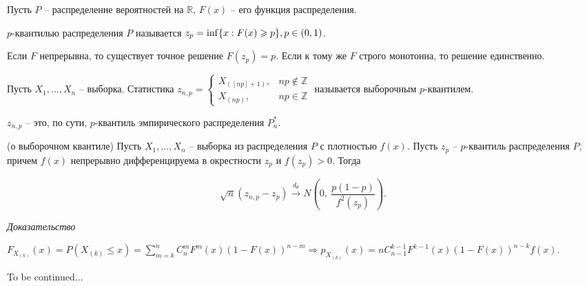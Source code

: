Пусть $\displaystyle P$ -- распределение вероятностей на $\displaystyle \mathbb{R}$, $\displaystyle F( x)$ -- его функция распределения.
\begin{definition}
$\displaystyle p$-квантилью распределения $\displaystyle P$ называется $\displaystyle z_{p} =\inf\{x:F( x) \geqslant p\},\\ p \in (0,1)$.
\end{definition}
\begin{note}
Если $\displaystyle F$ непрерывна, то существует точное решение $\displaystyle F( z_{p}) =p$. Если к тому же $\displaystyle F$ строго монотонна, то решение единственно.
\end{note}
\begin{definition}
Пусть $\displaystyle X_{1} ,\dotsc ,X_{n}$ -- выборка. Статистика $\displaystyle z_{n,p} =\begin{cases}
X_{([ np] +1)}, & np\notin \mathbb{Z}\\
X_{( np)}, & np\in \mathbb{Z}
\end{cases}$ называется выборочным $\displaystyle p$-квантилем.
\end{definition}
\begin{note}
$\displaystyle z_{n,p}$ -- это, по сути, $\displaystyle p$-квантиль эмпирического распределения $\displaystyle P_{n}^{*}$.
\end{note}
\begin{theorem}
(о выборочном квантиле) Пусть $\displaystyle X_{1} ,\dotsc ,X_{n}$ -- выборка из распределения $\displaystyle P$ с плотностью $\displaystyle f( x)$. Пусть $\displaystyle z_{p}$ -- $\displaystyle p$-квантиль распределения $\displaystyle P$, причем $\displaystyle f( x)$ непрерывно дифференцируема в окрестности $\displaystyle z_{p}$ и $\displaystyle f( z_{p})  >0$. Тогда


\begin{equation*}
\sqrt{n}( z_{n,p} -z_{p})\xrightarrow{d_{\theta }} N\left( 0,\ \frac{p( 1-p)}{f^{2}( z_{p})}\right) .
\end{equation*}
\end{theorem}
\textit{Доказательство}

$\displaystyle F_{X_{( k)}}( x) =P( X_{( k)} \leqslant x) =\sum _{m=k}^{n} C_{n}^{m} F^{m}( x)( 1-F( x))^{n-m} \Rightarrow p_{X_{( k)}}( x) =nC_{n-1}^{k-1} F^{k-1}( x)( 1-F( x))^{n-k} f( x)$.

To be continued...